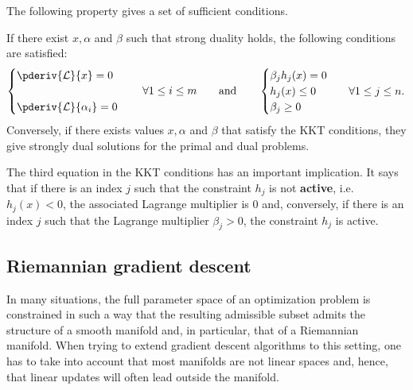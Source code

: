     The following property gives a set of sufficient conditions.
    \begin{property}\label{data:kkt}
        If there exist $x,\alpha$ and $\beta$ such that strong duality holds, the following conditions are satisfied:
        \begin{align}
            \begin{cases}
                \pderiv{\mathcal{L}}{x} = 0\\\\
                \pderiv{\mathcal{L}}{\alpha_i} = 0
            \end{cases}
            \quad\forall1\leq i\leq m \qquad\text{and}\qquad
            \begin{cases}
                \beta_jh_j(x) = 0\\
                h_j(x)\leq0&\quad\forall1\leq j\leq n.\\
                \beta_j\geq0
            \end{cases}
        \end{align}
        Conversely, if there exists values $x,\alpha$ and $\beta$ that satisfy the KKT conditions, they give strongly dual solutions for the primal and dual problems.
    \end{property}
    \begin{remark}\label{data:slackness}
        The third equation in the KKT conditions has an important implication. It says that if there is an index $j$ such that the constraint $h_j$ is not \textbf{active}, i.e.~$h_j(x)<0$, the associated Lagrange multiplier is 0 and, conversely, if there is an index $j$ such that the Lagrange multiplier $\beta_j>0$, the constraint $h_j$ is active.
    \end{remark}


\subsection{Riemannian gradient descent}

    In many situations, the full parameter space of an optimization problem is constrained in such a way that the resulting admissible subset admits the structure of a smooth manifold and, in particular, that of a Riemannian manifold. When trying to extend gradient descent algorithms to this setting, one has to take into account that most manifolds are not linear spaces and, hence, that linear updates will often lead outside the manifold.

